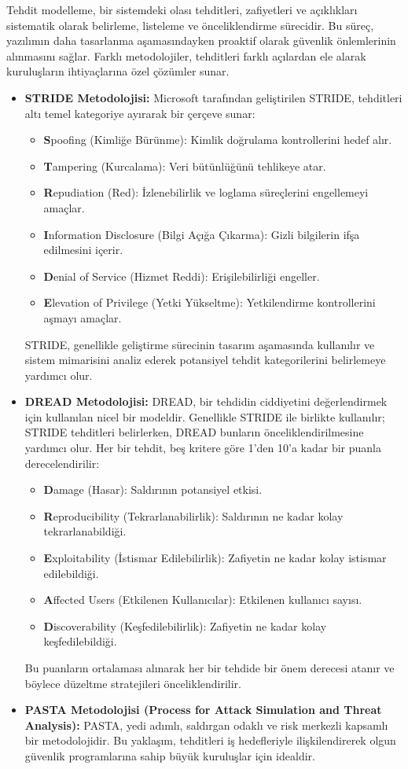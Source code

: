 Tehdit modelleme, bir sistemdeki olası tehditleri, zafiyetleri ve açıklıkları sistematik olarak belirleme, listeleme ve önceliklendirme sürecidir. Bu süreç, yazılımın daha tasarlanma aşamasındayken proaktif olarak güvenlik önlemlerinin alınmasını sağlar. Farklı metodolojiler, tehditleri farklı açılardan ele alarak kuruluşların ihtiyaçlarına özel çözümler sunar.

\begin{itemize}
\item \textbf{STRIDE Metodolojisi:} Microsoft tarafından geliştirilen STRIDE, tehditleri altı temel kategoriye ayırarak bir çerçeve sunar:
\begin{itemize}
\item \textbf{S}poofing (Kimliğe Bürünme): Kimlik doğrulama kontrollerini hedef alır.
\item \textbf{T}ampering (Kurcalama): Veri bütünlüğünü tehlikeye atar.
\item \textbf{R}epudiation (Red): İzlenebilirlik ve loglama süreçlerini engellemeyi amaçlar.
\item \textbf{I}nformation Disclosure (Bilgi Açığa Çıkarma): Gizli bilgilerin ifşa edilmesini içerir.
\item \textbf{D}enial of Service (Hizmet Reddi): Erişilebilirliği engeller.
\item \textbf{E}levation of Privilege (Yetki Yükseltme): Yetkilendirme kontrollerini aşmayı amaçlar.
\end{itemize}
STRIDE, genellikle geliştirme sürecinin tasarım aşamasında kullanılır ve sistem mimarisini analiz ederek potansiyel tehdit kategorilerini belirlemeye yardımcı olur.
\item \textbf{DREAD Metodolojisi:} DREAD, bir tehdidin ciddiyetini değerlendirmek için kullanılan nicel bir modeldir. Genellikle STRIDE ile birlikte kullanılır; STRIDE tehditleri belirlerken, DREAD bunların önceliklendirilmesine yardımcı olur. Her bir tehdit, beş kritere göre 1'den 10'a kadar bir puanla derecelendirilir:
\begin{itemize}
    \item \textbf{D}amage (Hasar): Saldırının potansiyel etkisi.
    \item \textbf{R}eproducibility (Tekrarlanabilirlik): Saldırının ne kadar kolay tekrarlanabildiği.
    \item \textbf{E}xploitability (İstismar Edilebilirlik): Zafiyetin ne kadar kolay istismar edilebildiği.
    \item \textbf{A}ffected Users (Etkilenen Kullanıcılar): Etkilenen kullanıcı sayısı.
    \item \textbf{D}iscoverability (Keşfedilebilirlik): Zafiyetin ne kadar kolay keşfedilebildiği.
\end{itemize}
Bu puanların ortalaması alınarak her bir tehdide bir önem derecesi atanır ve böylece düzeltme stratejileri önceliklendirilir.
\item \textbf{PASTA Metodolojisi (Process for Attack Simulation and Threat Analysis):} PASTA, yedi adımlı, saldırgan odaklı ve risk merkezli kapsamlı bir metodolojidir. Bu yaklaşım, tehditleri iş hedefleriyle ilişkilendirerek olgun güvenlik programlarına sahip büyük kuruluşlar için idealdir.
\end{itemize}
